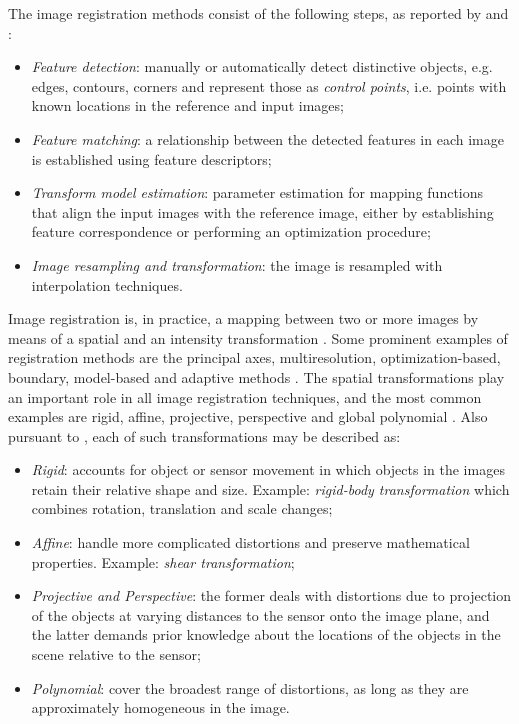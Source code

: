The image registration methods consist of the following steps, as reported by  and :

\begin{itemize}
    \item \emph{Feature detection}: manually or automatically detect distinctive objects, e.g. edges, contours, corners and represent those as \emph{control points}, i.e. points with known locations in the reference and input images;

    \item \emph{Feature matching}: a relationship between the detected features in each image is established using feature descriptors;

    \item \emph{Transform model estimation}: parameter estimation for mapping functions that align the input images with the reference image, either by establishing feature correspondence or performing an optimization procedure;

    \item \emph{Image resampling and transformation}: the image is resampled with interpolation techniques.

\end{itemize}

Image registration is, in practice, a mapping between two or more images by means of a spatial and an intensity transformation \cite{brown1992survey}. Some prominent examples of registration methods are the principal axes, multiresolution, optimization-based, boundary, model-based and adaptive methods  \cite{goshtasby2012image}. The spatial transformations play an important role in all image registration techniques, and the most common examples are rigid, affine, projective, perspective and global polynomial \cite{brown1992survey}. Also pursuant to , each of such transformations may be described as:

\begin{itemize}
    \item \emph{Rigid}: accounts for object or sensor movement in which objects in the images retain their relative shape and size. Example: \emph{rigid-body transformation} which combines rotation, translation and scale changes; 
    
    \item \emph{Affine}: handle more complicated distortions and preserve mathematical properties. Example: \emph{shear transformation};
    
    \item \emph{Projective and Perspective}: the former deals with distortions due to projection of the objects at varying distances to the sensor onto the image plane, and the latter demands prior knowledge about the locations of the objects in the scene relative to the sensor;
    
    \item \emph{Polynomial}: cover the broadest range of distortions, as long as they are approximately homogeneous in the image.
\end{itemize}

